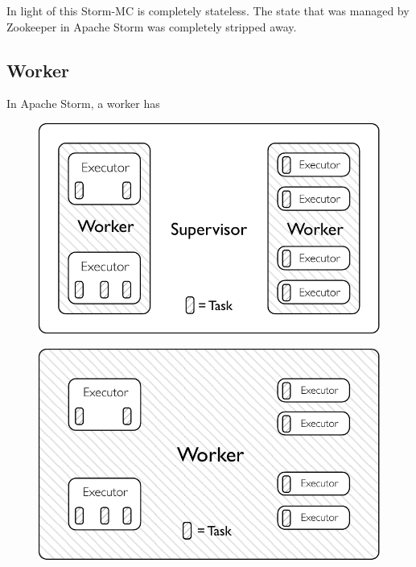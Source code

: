 \documentclass[bsc,logo,frontabs,twoside,singlespacing,normalheadings,parskip]{infthesis}     %
\begin{document}
In light of this Storm-MC is completely stateless. The state that was managed by Zookeeper in Apache Storm was completely stripped away.

\subsection{Worker}

In Apache Storm, a worker has

\begin{figure}
\centering
\begin{minipage}{.5\textwidth}
  \centering
  \includegraphics[width=0.9\linewidth]{pdf/distributed_worker.pdf}
  \captionsetup{width=0.9\linewidth,}
  \label{fig:test1}
\end{minipage}%
\begin{minipage}{.5\textwidth}
  \centering
  \includegraphics[width=0.9\linewidth]{pdf/local_worker.pdf}
  \captionsetup{width=0.9\linewidth}
  \label{fig:test2}
\end{minipage}
\end{figure}
\end{document}

